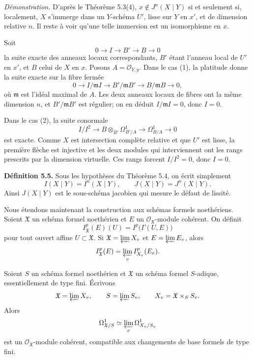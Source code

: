 \documentclass[11pt]{article}
\providecommand{\Oo}{\mathcal O}
\begin{document}
\emph{Démonstration.}  D'après le Théorème 5.3(4), \(x\notin J^n(X\mid Y)\) si et seulement si, localement, \(X\) s'immerge dans un \(Y\)-schéma \(U'\), lisse sur \(Y\) en \(x'\), et de dimension relative \(n\).  Il reste à voir qu'une telle immersion est un isomorphisme en \(x\).

Soit
\[
        0\longrightarrow I\longrightarrow B'\longrightarrow B\longrightarrow 0
\]
la suite exacte des anneaux locaux correspondants, \(B'\) étant l'anneau local de \(U'\) en \(x'\), et \(B\) celui de \(X\) en \(x\).  Posons \(A=\Oo_{Y,y}\).  Dans le cas (1), la platitude donne la suite exacte sur la fibre fermée
\[
        0\longrightarrow I/\mathfrak m I
        \longrightarrow B'/\mathfrak mB'
        \longrightarrow B/\mathfrak mB
        \longrightarrow 0,
\]
où \(\mathfrak m\) est l'idéal maximal de \(A\).  Les deux anneaux locaux de fibres ont la même dimension \(n\), et \(B'/\mathfrak mB'\) est régulier; on en déduit \(I/\mathfrak m I=0\), donc \(I=0\).

Dans le cas (2), la suite conormale
\[
        I/I^2\longrightarrow
        B\otimes_{B'}\Omega^1_{B'/A}
        \longrightarrow
        \Omega^1_{B/A}\longrightarrow 0
\]
est exacte.  Comme \(X\) est intersection complète relative et que \(U'\) est lisse, la première flèche est injective et les deux modules qui interviennent ont les rangs prescrits par la dimension virtuelle.  Ces rangs forcent \(I/I^2=0\), donc \(I=0\).

\textbf{Définition 5.5.}  Sous les hypothèses du Théorème 5.4, on écrit simplement
\[
        I(X\mid Y)=I^n(X\mid Y),\qquad
        J(X\mid Y)=J^n(X\mid Y).
\]
Ainsi \(J(X\mid Y)\) est le sous-schéma jacobien qui mesure le défaut de lissité.

Nous étendons maintenant la construction aux schémas formels noethériens.  Soient \(\mathfrak X\) un schéma formel noethérien et \(E\) un \(\Oo_{\mathfrak X}\)-module cohérent.  On définit
\[
        I^p_{\mathfrak X}(E)(U)=I^p\bigl(\Gamma(U,E)\bigr)
\]
pour tout ouvert affine \(U\subset\mathfrak X\).  Si \(\mathfrak X=\varprojlim X_v\) et \(E=\varprojlim E_v\), alors
\[
        I^p_{\mathfrak X}(E)=\varprojlim_v I^p_{X_v}(E_v).
\]

Soient \(S\) un schéma formel noethérien et \(\mathfrak X\) un schéma formel \(S\)-adique, essentiellement de type fini.  Écrivons
\[
        \mathfrak X=\varprojlim X_v,\qquad S=\varprojlim S_v,\qquad
        X_v=\mathfrak X\times_S S_v.
\]
Alors
\[
        \Omega^1_{\mathfrak X/S}\simeq \varprojlim_v\Omega^1_{X_v/S_v}
\]
est un \(\Oo_{\mathfrak X}\)-module cohérent, compatible aux changements de base formels de type fini.
\end{document}
